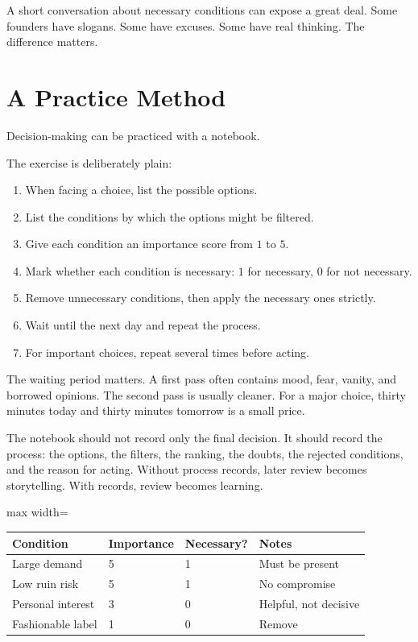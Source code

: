 A short conversation about necessary conditions can expose a great deal. Some founders have slogans. Some have excuses. Some have real thinking. The difference matters.

\section*{A Practice Method}

Decision-making can be practiced with a notebook.

The exercise is deliberately plain:

\begin{enumerate}
\item When facing a choice, list the possible options.
\item List the conditions by which the options might be filtered.
\item Give each condition an importance score from \(1\) to \(5\).
\item Mark whether each condition is necessary: \(1\) for necessary, \(0\) for not necessary.
\item Remove unnecessary conditions, then apply the necessary ones strictly.
\item Wait until the next day and repeat the process.
\item For important choices, repeat several times before acting.
\end{enumerate}

The waiting period matters. A first pass often contains mood, fear, vanity, and borrowed opinions. The second pass is usually cleaner. For a major choice, thirty minutes today and thirty minutes tomorrow is a small price.

The notebook should not record only the final decision. It should record the process: the options, the filters, the ranking, the doubts, the rejected conditions, and the reason for acting. Without process records, later review becomes storytelling. With records, review becomes learning.

\begin{center}
\begin{adjustbox}{max width=\linewidth}
\begin{tabular}{llll}
\hline
Condition & Importance & Necessary? & Notes \\
\hline
Large demand & 5 & 1 & Must be present \\
Low ruin risk & 5 & 1 & No compromise \\
Personal interest & 3 & 0 & Helpful, not decisive \\
Fashionable label & 1 & 0 & Remove \\
\hline
\end{tabular}
\end{adjustbox}
\end{center}

